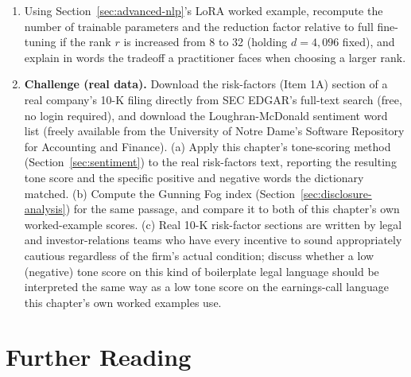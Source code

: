 \documentclass[../ai_in_finance]{subfiles}
\begin{document}
\begin{enumerate}
    \item Using Section~\ref{sec:advanced-nlp}'s LoRA worked example, recompute the number of trainable parameters and the reduction factor relative to full fine-tuning if the rank $r$ is increased from 8 to 32 (holding $d=4{,}096$ fixed), and explain in words the tradeoff a practitioner faces when choosing a larger rank.
    \item \textbf{Challenge (real data).} Download the risk-factors (Item 1A) section of a real company's 10-K filing directly from SEC EDGAR's full-text search (free, no login required), and download the Loughran-McDonald sentiment word list (freely available from the University of Notre Dame's Software Repository for Accounting and Finance). (a) Apply this chapter's tone-scoring method (Section~\ref{sec:sentiment}) to the real risk-factors text, reporting the resulting tone score and the specific positive and negative words the dictionary matched. (b) Compute the Gunning Fog index (Section~\ref{sec:disclosure-analysis}) for the same passage, and compare it to both of this chapter's own worked-example scores. (c) Real 10-K risk-factor sections are written by legal and investor-relations teams who have every incentive to sound appropriately cautious regardless of the firm's actual condition; discuss whether a low (negative) tone score on this kind of boilerplate legal language should be interpreted the same way as a low tone score on the earnings-call language this chapter's own worked examples use.
\end{enumerate}

\section{Further Reading}
\end{document}
